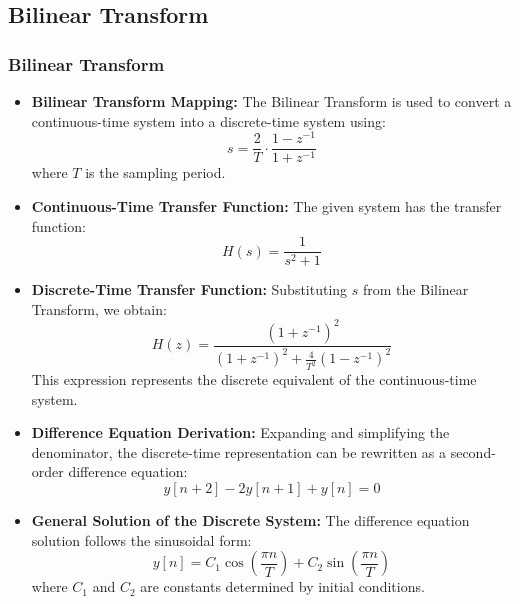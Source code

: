 \documentclass{beamer}
\theoremstyle{remark}
\numberwithin{equation}{section}
\begin{document}
	\subsection{Bilinear Transform}
	\begin{frame}[allowframebreaks]
		\frametitle{Bilinear Transform}
		
		\begin{itemize}
			\item \textbf{Bilinear Transform Mapping:} The Bilinear Transform is used to convert a continuous-time system into a discrete-time system using:
			\[
			s = \frac{2}{T} \cdot \frac{1 - z^{-1}}{1 + z^{-1}}
			\]
			where \( T \) is the sampling period.
			
			\item \textbf{Continuous-Time Transfer Function:} The given system has the transfer function:
			\[
			H(s) = \frac{1}{s^2 + 1}
			\]
			
			\item \textbf{Discrete-Time Transfer Function:} Substituting \( s \) from the Bilinear Transform, we obtain:
			\[
			H(z) = \frac{(1 + z^{-1})^2}{(1 + z^{-1})^2 + \frac{4}{T^2}(1 - z^{-1})^2}
			\]
			This expression represents the discrete equivalent of the continuous-time system.
			
			\item \textbf{Difference Equation Derivation:} Expanding and simplifying the denominator, the discrete-time representation can be rewritten as a second-order difference equation:
			\[
			y[n+2] - 2y[n+1] + y[n] = 0
			\]
			
			\item \textbf{General Solution of the Discrete System:} The difference equation solution follows the sinusoidal form:
			\[
			y[n] = C_1 \cos\left( \frac{\pi n}{T} \right) + C_2 \sin\left( \frac{\pi n}{T} \right)
			\]
			where \( C_1 \) and \( C_2 \) are constants determined by initial conditions.
		\end{itemize}
		
	\end{frame}
	
\end{document}
